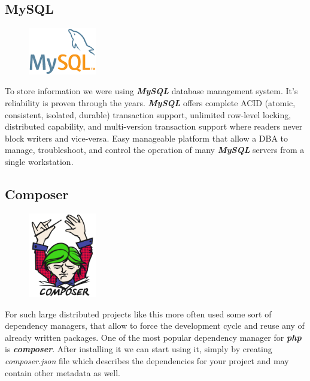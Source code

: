     \subsection{MySQL}
\begin{figure}
	\includegraphics[width=3cm]{img/zf2/mysql-logo.png}
\end{figure} 
To store information we were using \textbf{\textit{MySQL}} database management system. It's reliability is proven through the years. \textbf{\textit{MySQL}} offers complete ACID (atomic, consistent, isolated, durable) transaction support, unlimited row-level locking, distributed capability, and multi-version transaction support where readers never block writers and vice-versa. Easy manageable platform that allow a DBA to manage, troubleshoot, and control the operation of many \textbf{\textit{MySQL}} servers from a single workstation. ~\cite{MySQL_Top10_Reasons}

    \subsection{Composer}
\begin{figure}
	\includegraphics[width=3cm]{img/zf2/composer-logo.png}
\end{figure} 
For such large distributed projects like this more often used some sort of dependency managers, that allow to force the development cycle and reuse any of already written packages. One of the most popular dependency manager for \textbf{\textit{php}} is \textbf{\textit{composer}}.
After installing it we can start using it, simply by creating \textit{composer.json} file which describes the dependencies for your project and may contain other metadata as well.~\cite{Composer_doc} 

